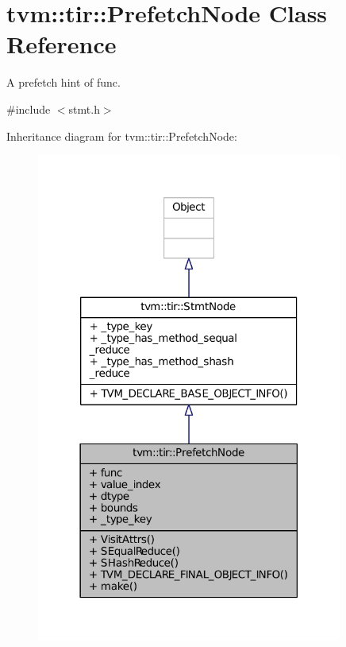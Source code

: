 \hypertarget{classtvm_1_1tir_1_1PrefetchNode}{}\section{tvm\+:\+:tir\+:\+:Prefetch\+Node Class Reference}
\label{classtvm_1_1tir_1_1PrefetchNode}


A prefetch hint of func.  




{\ttfamily \#include $<$stmt.\+h$>$}



Inheritance diagram for tvm\+:\+:tir\+:\+:Prefetch\+Node\+:
\nopagebreak
\begin{figure}[H]
\begin{center}
\leavevmode
\includegraphics[width=285pt]{classtvm_1_1tir_1_1PrefetchNode__inherit__graph}
\end{center}
\end{figure}


